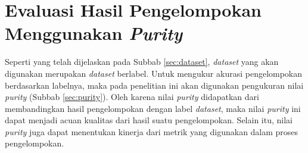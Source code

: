 \section{Evaluasi Hasil Pengelompokan Menggunakan \textit{Purity}}
Seperti yang telah dijelaskan pada Subbab \ref{sec:dataset}, \textit{dataset} yang akan digunakan merupakan \textit{dataset} berlabel. Untuk mengukur akurasi pengelompokan berdasarkan labelnya, maka pada penelitian ini akan digunakan pengukuran nilai \textit{purity} (Subbab \ref{sec:purity}). Oleh karena nilai \textit{purity} didapatkan dari membandingkan hasil pengelompokan dengan label \textit{dataset}, maka nilai \textit{purity} ini dapat menjadi acuan kualitas dari hasil suatu pengelompokan. Selain itu, nilai \textit{purity} juga dapat menentukan kinerja dari metrik yang digunakan dalam proses pengelompokan.
